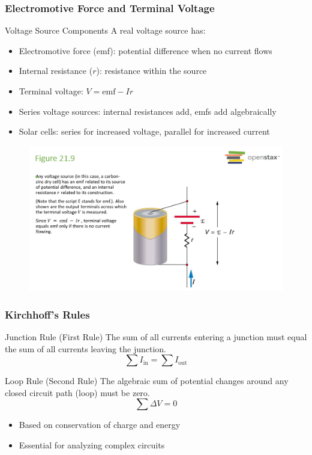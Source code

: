 \documentclass{beamer}
\begin{document}
\begin{frame}
    \frametitle{Electromotive Force and Terminal Voltage}
    \begin{block}{Voltage Source Components}
        A real voltage source has:
        \begin{itemize}
            \item Electromotive force (emf): potential difference when no current flows
            \item Internal resistance ($r$): resistance within the source
        \end{itemize}
    \end{block}
    \begin{itemize}
        \item Terminal voltage: $V = \text{emf} - Ir$
        \item Series voltage sources: internal resistances add, emfs add algebraically
        \item Solar cells: series for increased voltage, parallel for increased current
    \end{itemize}
    
\end{frame}
\begin{frame}
\begin{figure}
    \centering
    \includegraphics[width=1\linewidth]{inres.png}
\end{figure}
\end{frame}
\begin{frame}
    \frametitle{Kirchhoff's Rules}
    \begin{block}{Junction Rule (First Rule)}
        The sum of all currents entering a junction must equal the sum of all currents leaving the junction.
        \[ \sum I_{\text{in}} = \sum I_{\text{out}} \]
    \end{block}
    \begin{block}{Loop Rule (Second Rule)}
        The algebraic sum of potential changes around any closed circuit path (loop) must be zero.
        \[ \sum \Delta V = 0 \]
    \end{block}
    \begin{itemize}
        \item Based on conservation of charge and energy
        \item Essential for analyzing complex circuits
    \end{itemize}
    \end{frame}
\end{document}
